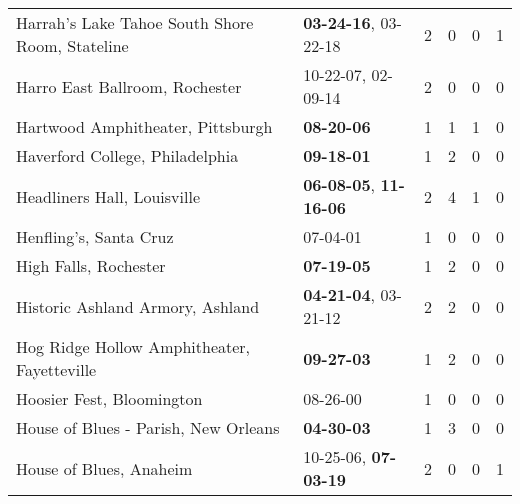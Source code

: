 \begin{longtable}{p{}p{}p{}p{}p{}p{}}
                              Harrah’s Lake Tahoe South Shore Room, Stateline &           \textbf{03-24-16\textsuperscript{}}, 03-22-18\textsuperscript{} &  2 &  0 &  0 &  1 \\
                                               Harro East Ballroom, Rochester &                    10-22-07\textsuperscript{}, 02-09-14\textsuperscript{} &  2 &  0 &  0 &  0 \\
                                            Hartwood Amphitheater, Pittsburgh &                                       \textbf{08-20-06\textsuperscript{}} &  1 &  1 &  1 &  0 \\
                                              Haverford College, Philadelphia &                                       \textbf{09-18-01\textsuperscript{}} &  1 &  2 &  0 &  0 \\
                                                  Headliners Hall, Louisville &  \textbf{06-08-05\textsuperscript{}}, \textbf{11-16-06\textsuperscript{}} &  2 &  4 &  1 &  0 \\
                                                       Henfling's, Santa Cruz &                                                07-04-01\textsuperscript{} &  1 &  0 &  0 &  0 \\
                                                        High Falls, Rochester &                                       \textbf{07-19-05\textsuperscript{}} &  1 &  2 &  0 &  0 \\
                                             Historic Ashland Armory, Ashland &           \textbf{04-21-04\textsuperscript{}}, 03-21-12\textsuperscript{} &  2 &  2 &  0 &  0 \\
                                  Hog Ridge Hollow Amphitheater, Fayetteville &                                       \textbf{09-27-03\textsuperscript{}} &  1 &  2 &  0 &  0 \\
                                                    Hoosier Fest, Bloomington &                                                08-26-00\textsuperscript{} &  1 &  0 &  0 &  0 \\
                                         House of Blues - Parish, New Orleans &                                       \textbf{04-30-03\textsuperscript{}} &  1 &  3 &  0 &  0 \\
                                                      House of Blues, Anaheim &           10-25-06\textsuperscript{}, \textbf{07-03-19\textsuperscript{}} &  2 &  0 &  0 &  1 \\

\end{longtable}

